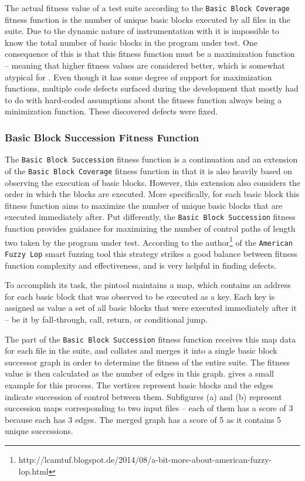 The actual fitness value of a test suite according to the \texttt{Basic Block Coverage} fitness function 
is the number of unique basic blocks executed by all \xml files in the suite. Due to the dynamic nature 
of instrumentation with \pin it is impossible to know the total number of basic blocks in the program 
under test. One consequence of this is that this fitness function must be a maximization function -- meaning
that higher fitness values are considered better, which is somewhat atypical for \evosuite. Even though it has
some degree of support for maximization functions, multiple code defects surfaced during the development that
mostly had to do with hard-coded assumptions about the fitness function always being a minimization function.
These discovered defects were fixed.

\subsubsection{Basic Block Succession Fitness Function}
The \texttt{Basic Block Succession} fitness function is a continuation and an extension of the
\texttt{Basic Block Coverage} fitness function in that it is also heavily based on observing the execution of
basic blocks. However, this extension also considers the order in which the blocks are executed. More
specifically, for each basic block this fitness function aims to maximize the number of unique basic blocks
that are executed immediately after.
Put differently, the \texttt{Basic Block Succession} fitness function provides guidance for maximizing the
number of control paths of length two taken by the program under test. According to the
author\footnote{http://lcamtuf.blogspot.de/2014/08/a-bit-more-about-american-fuzzy-lop.html} of the
\texttt{American Fuzzy Lop} smart fuzzing tool\cite{afl} this strategy strikes a good balance between
fitness function complexity and effectiveness, and is very helpful in finding defects.

To accomplish its task, the pintool maintains a map, which contains an address for each basic block that was
observed to be executed as a key. Each key is assigned as value a set of all basic blocks that were executed
immediately after it -- be it by fall-through, call, return, or conditional jump. 

The \java part of the \texttt{Basic Block Succession} fitness function receives this map data for each file in
the suite, and collates and merges it into a single basic block successor graph in order to determine the
fitness of the entire suite. The fitness value is then calculated as the number of edges in this graph. 
 gives a small example for this process. The vertices represent basic blocks and the edges
indicate succession of control between them. Subfigures (a) and (b) represent succession maps corresponding to
two input files -- each of them has a score of 3 because each has 3 edges. The merged graph has a score of 5 as
it contains 5 unique successions.


